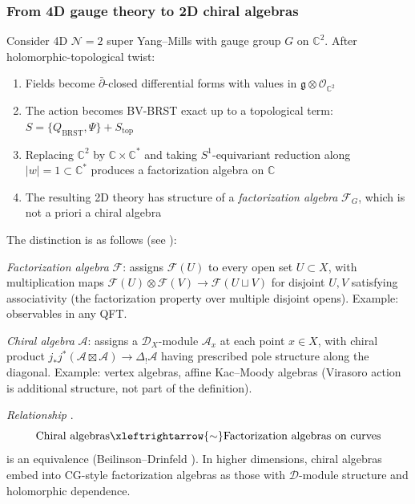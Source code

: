 \subsubsection{From 4D gauge theory to 2D chiral algebras}

\begin{theorem}\label{thm:costello-li-reduction}
\cite{CL16} Consider 4D $\mathcal{N}=2$ super Yang--Mills with gauge group $G$
on $\mathbb{C}^2$. After holomorphic-topological twist:
\begin{enumerate}
\item Fields become $\bar{\partial}$-closed differential forms with values in
 $\mathfrak{g} \otimes \mathcal{O}_{\mathbb{C}^2}$

\item The action becomes BV-BRST exact up to a topological term: $S = \{Q_{\text{BRST}}, \Psi\} + S_{\mathrm{top}}$

\item Replacing $\mathbb{C}^2$ by $\mathbb{C} \times \mathbb{C}^*$ and taking $S^1$-equivariant reduction along $|w| = 1 \subset \mathbb{C}^*$
 produces a factorization algebra on $\mathbb{C}$

\item The resulting 2D theory has structure of a \emph{factorization algebra}
 $\mathcal{F}_G$, which is not a priori a chiral algebra
\end{enumerate}
\end{theorem}

\begin{remark}\label{rem:fact-vs-chiral}
The distinction is as follows (see ):

\emph{Factorization algebra} $\mathcal{F}$: assigns $\mathcal{F}(U)$ to every open set $U \subset X$, with multiplication maps $\mathcal{F}(U) \otimes \mathcal{F}(V) \to \mathcal{F}(U \sqcup V)$ for disjoint $U, V$ satisfying associativity (the factorization property over multiple disjoint opens). Example: observables in any QFT.

\emph{Chiral algebra} $\mathcal{A}$: assigns a $\mathcal{D}_X$-module $\mathcal{A}_x$ at each point $x \in X$, with chiral product $j_*j^*(\mathcal{A} \boxtimes \mathcal{A}) \to \Delta_!\mathcal{A}$ having prescribed pole structure along the diagonal. Example: vertex algebras, affine Kac--Moody algebras (Virasoro action is additional structure, not part of the definition).

\emph{Relationship} \cite{BD04,CG17}.
\[\text{Chiral algebras} \xleftrightarrow{\sim} \text{Factorization algebras on curves}\]
is an equivalence (Beilinson--Drinfeld \cite[Theorem~3.4.9]{BD04}). In higher dimensions, chiral algebras embed into CG-style factorization algebras as those with $\mathcal{D}$-module structure and holomorphic dependence.
\end{remark}

